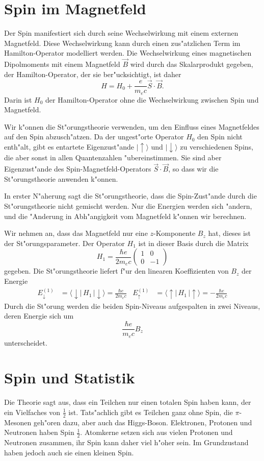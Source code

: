 \section{Spin im Magnetfeld}
Der Spin manifestiert sich durch seine Wechselwirkung mit einem
externen Magnetfeld.
Diese Wechselwirkung kann durch einen zus"atzlichen Term im
Hamilton-Operator modelliert werden.
Die Wechselwirkung eines magnetischen Dipolmoments mit einem
Magnetfeld $\vec B$ wird durch das Skalarprodukt gegeben,
der Hamilton-Operator, der sie ber"ucksichtigt, ist daher
\[
H=H_0 + \frac{e}{m_ec}\vec S\cdot\vec B.
\]
Darin ist $H_0$ der Hamilton-Operator ohne die Wechselwirkung 
zwischen Spin und Magnetfeld.

Wir k"onnen die St"orungstheorie verwenden, um den Einfluss eines
Magnetfeldes auf den Spin abzusch"atzen.
Da der ungest"orte Operator $H_0$ den Spin nicht enth"alt, gibt
es entartete Eigenzust"ande
$|\uparrow\rangle$ und $|\downarrow\rangle$
zu verschiedenen Spins, die aber sonst in allen Quantenzahlen
"ubereinstimmen.
Sie sind aber Eigenzust"ande des Spin-Magnetfeld-Operators
$\vec S\cdot \vec B$, so dass wir die St"orungstheorie anwenden
k"onnen.

In erster N"aherung sagt die St"orungstheorie, dass die Spin-Zust"ande
durch die St"orungstheorie nicht gemischt werden.
Nur die Energien werden sich "andern, und die "Anderung in 
Abh"angigkeit vom Magnetfeld k"onnen wir berechnen.

Wir nehmen an, dass das Magnetfeld nur eine $z$-Komponente $B_z$ hat,
dieses ist der St"orungsparameter.
Der Operator $H_1$ ist in dieser Basis durch die Matrix
\[
H_1=
\frac{\hbar e}{2m_ec}
\begin{pmatrix}
1&0\\
0&-1
\end{pmatrix}
\]
gegeben.
Die St"orungstheorie liefert f"ur den linearen Koeffizienten von $B_z$
der Energie
\begin{align*}
E_\downarrow^{(1)}
&=
\langle \downarrow|\, H_1 \,|\downarrow\rangle
=\frac{\hbar e}{2m_e c}
&
E_\uparrow^{(1)}
&=
\langle \uparrow|\, H_1 \,|\uparrow\rangle
=-\frac{\hbar e}{2m_e c}
\end{align*}
Durch die St"orung werden die beiden Spin-Niveaus aufgespalten
in zwei Niveaus, deren Energie sich um
\[
\frac{\hbar e}{m_e c}B_z
\]
unterscheidet.

\section{Spin und Statistik}
Die Theorie sagt aus, dass ein Teilchen nur einen totalen Spin haben kann,
der ein Vielfaches von $\frac12$ ist. Tats"achlich gibt es Teilchen
ganz ohne Spin, die $\pi$-Mesonen geh"oren dazu, aber auch das Higgs-Boson.
Elektronen, Protonen und Neutronen haben Spin $\frac12$. 
Atomkerne setzen sich aus vielen Protonen und Neutronen zusammen, ihr
Spin kann daher viel h"oher sein. Im Grundzustand haben jedoch auch
sie einen kleinen Spin.

